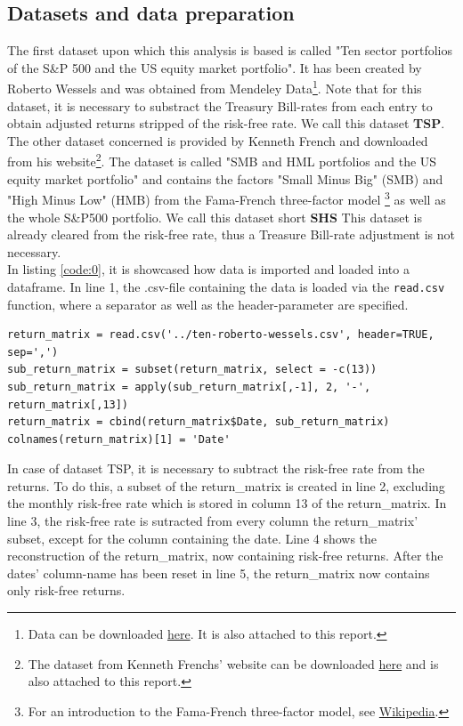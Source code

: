 \subsection{Datasets and data preparation}
The first dataset upon which this analysis is based is called "Ten sector portfolios of the S\&P 500 and the US equity market portfolio". It has been created by Roberto Wessels and was obtained from Mendeley Data\footnote{Data can be downloaded \href{https://data.mendeley.com/datasets/ndxfrshm74/3}{here}. It is also attached to this report.}. Note that for this dataset, it is necessary to substract the Treasury Bill-rates from each entry to obtain adjusted returns stripped of the risk-free rate. We call this dataset \textbf{TSP}.\\

The other dataset concerned is provided by Kenneth French and downloaded from his website\footnote{The dataset from Kenneth Frenchs' website can be downloaded \href{http://mba.tuck.dartmouth.edu/pages/faculty/ken.french/ftp/F-F_Research_Data_Factors_CSV.zip}{here} and is also attached to this report.}. The dataset is called "SMB and HML portfolios and the US equity market portfolio" and contains the factors "Small Minus Big" (SMB) and "High Minus Low" (HMB) from the Fama-French three-factor model \footnote{For an introduction to the Fama-French three-factor model, see \href{https://en.wikipedia.org/wiki/Fama\%E2\%80\%93French_three-factor_model}{Wikipedia}.} as well as the whole S\&P500 portfolio. We call this dataset short \textbf{SHS} This dataset is already cleared from the risk-free rate, thus a Treasure Bill-rate adjustment is not necessary. \\

In listing \ref{code:0}, it is showcased how data is imported and loaded into a dataframe. In line 1, the .csv-file containing the data is loaded via the \lstinline|read.csv| function, where a separator as well as the header-parameter are specified. 

\begin{lstlisting}[caption={Loading the data and subtracting the risk-free rate from the columns of returns yields a dataframe containing the matrix of excess-returns.}, label=code:0, frame=single]
return_matrix = read.csv('../ten-roberto-wessels.csv', header=TRUE, sep=',')
sub_return_matrix = subset(return_matrix, select = -c(13))
sub_return_matrix = apply(sub_return_matrix[,-1], 2, '-', return_matrix[,13])
return_matrix = cbind(return_matrix$Date, sub_return_matrix)
colnames(return_matrix)[1] = 'Date'
\end{lstlisting}
In case of dataset TSP, it is necessary to subtract the risk-free rate from the returns. To do this, a subset of the return\_matrix is created in line 2, excluding the monthly risk-free rate which is stored in column 13 of the return\_matrix. In line 3, the risk-free rate is sutracted from every column the return\_matrix' subset, except for the column containing the date. Line 4 shows the reconstruction of the return\_matrix, now containing risk-free returns. After the dates' column-name has been reset in line 5, the return\_matrix now contains only risk-free returns. 

